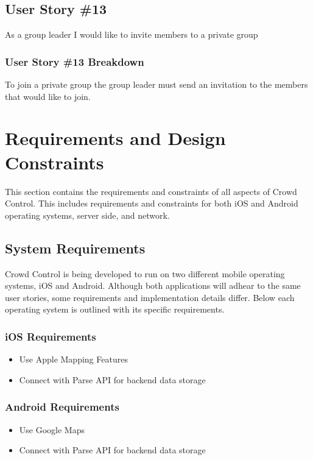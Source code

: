 \subsection{User Story \#13}
As a group leader I would like to invite members to a private group
\subsubsection{User Story \#13 Breakdown}
To join a private group the group leader must send an invitation to the members that would like to join. 

\section{Requirements and Design Constraints}

This section contains the requirements and constraints of all aspects of Crowd Control.  This includes requirements and constraints for both iOS and Android operating systems, server side, and network.


\subsection{System Requirements}

Crowd Control is being developed to run on two different mobile operating systems, iOS and Android.  Although both applications will adhear to the same user stories, some requirements and implementation details differ.  Below each operating system is outlined with its specific requirements.

\subsubsection{iOS Requirements}
\begin{itemize}
\item{Use Apple Mapping Features}
\item{Connect with Parse API for backend data storage}
\end{itemize}
\subsubsection{Android Requirements}
\begin{itemize}
\item{Use Google Maps}
\item{Connect with Parse API for backend data storage}
\end{itemize}

